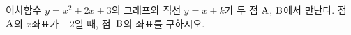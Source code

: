 이차함수 $y=x^2+2x+3$의 그래프와 직선 $y=x+k$가 두 점 $\mathrm{A}$, $\mathrm{B}$에서 만난다. 점~$\mathrm{A}$의 $x$좌표가 $-2$일 때, 점~$\mathrm{B}$의 좌표를 구하시오. 
